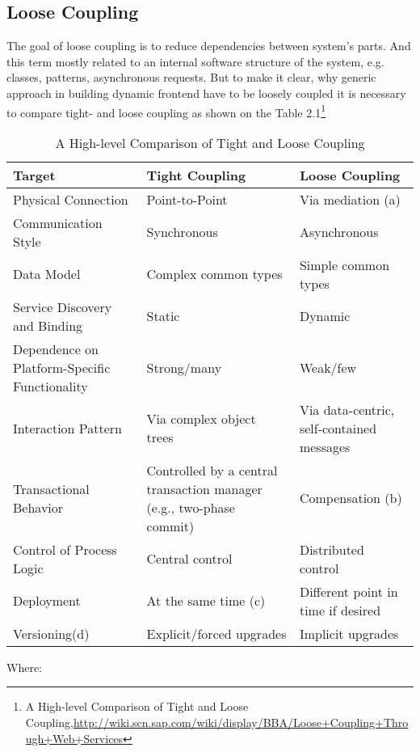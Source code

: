 \subsection {Loose Coupling}
The goal of loose coupling is to reduce dependencies between system's parts. And this term mostly related to an internal software structure of the system, e.g. classes, patterns, asynchronous requests. But to make it clear, why generic approach in building dynamic frontend have to be loosely coupled it is necessary to compare tight- and loose coupling as shown on the Table 2.1\footnote{A High-level Comparison of Tight and Loose Coupling,\url{http://wiki.scn.sap.com/wiki/display/BBA/Loose+Coupling+Through+Web+Services}}
\begin{table}[H]
	\centering
	\begin{tabular}{|L{3cm}|L{5cm}|l|}
	\hline
	Target 			      & \textbf{Tight Coupling} & \textbf{Loose Coupling} \\
	\hline
	\hline
	Physical Connection		         & Point-to-Point & Via mediation (a)  \\
	\hline
	Communication Style		         & Synchronous & Asynchronous  \\
	\hline
	Data Model		                 & Complex common types & Simple common types  \\
	\hline
	Service Discovery and Binding    & Static & Dynamic  \\
	\hline
	Dependence on Platform-Specific Functionality		& Strong/many & Weak/few  \\
	\hline
	Interaction Pattern		         & Via complex object trees & Via data-centric, self-contained messages  \\
	\hline
	Transactional Behavior		    & Controlled by a central transaction manager (e.g., two-phase commit) & Compensation (b)  \\
	\hline
	Control of Process Logic		& Central control & Distributed control  \\
	\hline
	Deployment	                    & At the same time (c) & Different point in time if desired  \\
	\hline 		
	Versioning(d) 		            & Explicit/forced upgrades & Implicit upgrades  \\
	\hline 
	\end{tabular}
	\caption[A High-level Comparison of Tight and Loose Coupling]{A High-level Comparison of Tight and Loose Coupling}
	\label{tab:loose_coupling}
	\end{table}
Where: 
\newline
